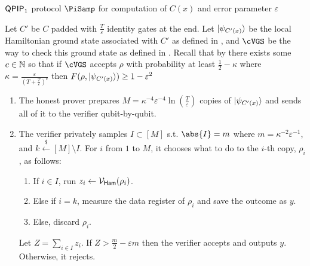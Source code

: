\begin{protocol}{$\operatorname{\mathsf{QPIP}}_1$ protocol $\PiSamp$ for computation of $C(x)$ and error parameter $\varepsilon$}\label{ProtoQPIP1}

	Let $C'$ be $C$ padded with $\frac{T}{\varepsilon}$ identity gates at the end.
	Let $\ket{\psi_{C'(x)}}$ be the local Hamiltonian ground state associated with $C'$ as defined in ,
	and $\cVGS$ be the way to check this ground state as defined in .
	Recall that by  there exists some $c\in\mathbb{N}$
	so that if $\cVGS$ accepts $\rho$ with probability at least $\frac{1}{2}-\kappa$ where $\kappa=\frac{\varepsilon}{(T+\frac{T}{\varepsilon})^c}$ then $F(\rho, \ket{\psi_{C'(x)}})\geq1-\varepsilon^2$

	
	
	

	\begin{enumerate}
		\item The honest prover prepares $M=\kappa^{-4}\varepsilon^{-4}\ln(\frac{T}{\varepsilon})$ copies  of $\ket{\psi_{C'(x)}}$ and sends all of it to the verifier qubit-by-qubit.
		\item The verifier privately samples $I\subset[M]$ s.t. $\abs{I}=m$ where $m=\kappa^{-2}\varepsilon^{-1}$, and $k\xleftarrow{\$}[M]\setminus I$.
			For $i$ from $1$ to $M$, it chooses what to do to the $i$-th copy, $\rho_i$, as follows:
		\begin{enumerate}
			\item If $i\in I$, run $z_i\leftarrow\mathcal{V}_{\mathsf{Ham}}(\rho_i)$.
			\item Else if $i=k$, measure the data register  of $\rho_i$ and save the outcome as $y$.
			\item Else, discard $\rho_i$.
		\end{enumerate}
			Let $Z=\sum_{i\in I} z_i$. If $Z>\frac{m}{2}-\varepsilon m$ then the verifier accepts and outputs $y$. Otherwise, it rejects.
	\end{enumerate}
\end{protocol}

